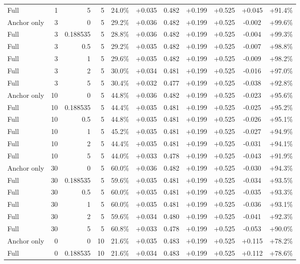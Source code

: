 \begin{table}[htbp]
\begin{tabular}{lrrrccccccc}
Full & 1 & 5 & 5 & 24.0\% & +0.035 & 0.482 & +0.199 & +0.525 & +0.045 & +91.4\% \\
Anchor only & 3 & 0 & 5 & 29.2\% & +0.036 & 0.482 & +0.199 & +0.525 & -0.002 & +99.6\% \\
Full & 3 & 0.188535 & 5 & 28.8\% & +0.036 & 0.482 & +0.199 & +0.525 & -0.004 & +99.3\% \\
Full & 3 & 0.5 & 5 & 29.2\% & +0.035 & 0.482 & +0.199 & +0.525 & -0.007 & +98.8\% \\
Full & 3 & 1 & 5 & 29.6\% & +0.035 & 0.482 & +0.199 & +0.525 & -0.009 & +98.2\% \\
Full & 3 & 2 & 5 & 30.0\% & +0.034 & 0.481 & +0.199 & +0.525 & -0.016 & +97.0\% \\
Full & 3 & 5 & 5 & 30.4\% & +0.032 & 0.477 & +0.199 & +0.525 & -0.038 & +92.8\% \\
Anchor only & 10 & 0 & 5 & 44.8\% & +0.036 & 0.482 & +0.199 & +0.525 & -0.023 & +95.6\% \\
Full & 10 & 0.188535 & 5 & 44.4\% & +0.035 & 0.481 & +0.199 & +0.525 & -0.025 & +95.2\% \\
Full & 10 & 0.5 & 5 & 44.8\% & +0.035 & 0.481 & +0.199 & +0.525 & -0.026 & +95.1\% \\
Full & 10 & 1 & 5 & 45.2\% & +0.035 & 0.481 & +0.199 & +0.525 & -0.027 & +94.9\% \\
Full & 10 & 2 & 5 & 44.4\% & +0.035 & 0.481 & +0.199 & +0.525 & -0.031 & +94.1\% \\
Full & 10 & 5 & 5 & 44.0\% & +0.033 & 0.478 & +0.199 & +0.525 & -0.043 & +91.9\% \\
Anchor only & 30 & 0 & 5 & 60.0\% & +0.036 & 0.482 & +0.199 & +0.525 & -0.030 & +94.3\% \\
Full & 30 & 0.188535 & 5 & 59.6\% & +0.035 & 0.481 & +0.199 & +0.525 & -0.034 & +93.5\% \\
Full & 30 & 0.5 & 5 & 60.0\% & +0.035 & 0.481 & +0.199 & +0.525 & -0.035 & +93.3\% \\
Full & 30 & 1 & 5 & 60.0\% & +0.035 & 0.481 & +0.199 & +0.525 & -0.036 & +93.1\% \\
Full & 30 & 2 & 5 & 59.6\% & +0.034 & 0.480 & +0.199 & +0.525 & -0.041 & +92.3\% \\
Full & 30 & 5 & 5 & 60.8\% & +0.033 & 0.478 & +0.199 & +0.525 & -0.053 & +90.0\% \\
Anchor only & 0 & 0 & 10 & 21.6\% & +0.035 & 0.483 & +0.199 & +0.525 & +0.115 & +78.2\% \\
Full & 0 & 0.188535 & 10 & 21.6\% & +0.034 & 0.483 & +0.199 & +0.525 & +0.112 & +78.6\% \\

\end{tabular}
\end{table}
